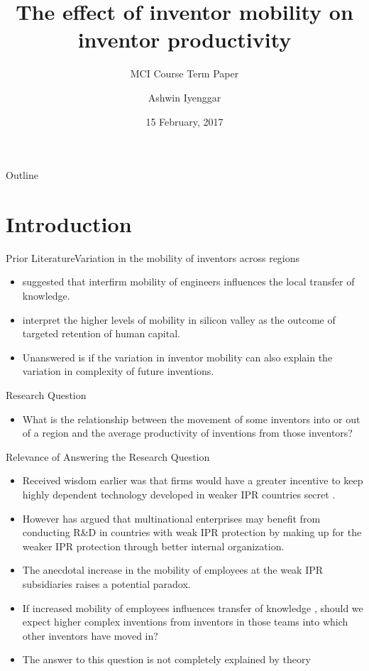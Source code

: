 \documentclass{beamer}
\title{The effect of inventor mobility on  inventor productivity}
\subtitle{MCI Course Term Paper}
\author{Ashwin Iyenggar}
\institute[Indian Institute of Management Bangalore] 
{
  Corporate Strategy and Policy\\
  Indian Institute of Management Bangalore
}
\date{15 February, 2017}
\begin{document}
\begin{frame}
  \titlepage
\end{frame}

\begin{frame}{Outline}
  \tableofcontents
\end{frame}

\section{Introduction}
\begin{frame}{Prior Literature}{Variation in the mobility of inventors across regions}
\begin{itemize}
\item{\cite{Almeida1999} suggested that interfirm mobility of engineers influences the local transfer of knowledge.}
\item{\cite{Ge2016} interpret the higher levels of mobility in silicon valley as the outcome of targeted retention of human capital.}
\item{Unanswered is if the variation in inventor mobility can also explain the variation in complexity of future inventions.}
\end{itemize}
\end{frame}

\begin{frame}{Research Question}{}
\begin{itemize}
\item{What is the relationship between the movement of some inventors into or out of a region and the average productivity of inventions from those inventors?}
\end{itemize}
\end{frame}

\begin{frame}{Relevance of Answering the Research Question}{}
\begin{itemize}
\item{Received wisdom earlier was that firms would have a greater incentive to keep  highly dependent technology developed in weaker IPR countries secret \citep{Cohen2000}.}
\item{However  \cite{Zhao2006} has argued  that multinational enterprises may benefit from conducting R\&D in countries with weak IPR protection by  making up for the weaker IPR protection through better internal organization.}
\item{The anecdotal increase in the mobility of employees at the weak IPR subsidiaries raises a potential paradox.}
\item{If increased mobility of employees influences transfer of knowledge \citep{Almeida1999}, should we expect higher complex inventions from inventors in those teams into which other inventors have moved in?}
\item{The answer to this question is not completely explained by theory}
\end{itemize}
\end{frame}
\end{document}

